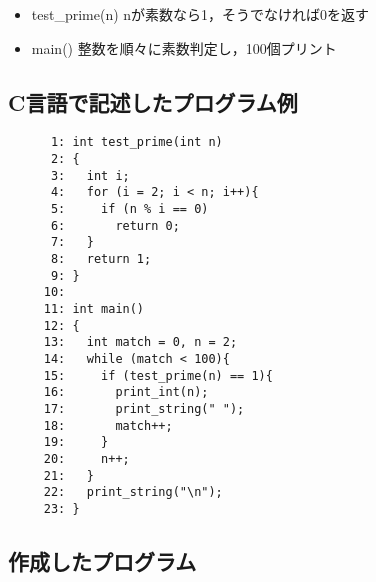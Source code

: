 \documentclass[a4j,11pt]{jarticle}
\begin{document}
\begin{itemize}
      \item test\_prime(n)    nが素数なら1，そうでなければ0を返す
      \item main()       整数を順々に素数判定し，100個プリント
\end{itemize}

\subsection{C言語で記述したプログラム例}

\begin{verbatim}
      1: int test_prime(int n)
      2: {
      3:   int i;
      4:   for (i = 2; i < n; i++){
      5:     if (n % i == 0)
      6:       return 0;
      7:   }
      8:   return 1;
      9: }
     10: 
     11: int main()
     12: {
     13:   int match = 0, n = 2;
     14:   while (match < 100){
     15:     if (test_prime(n) == 1){
     16:       print_int(n);
     17:       print_string(" ");
     18:       match++;
     19:     }
     20:     n++;
     21:   }
     22:   print_string("\n");
     23: }
\end{verbatim}

\subsection{作成したプログラム}
\end{document}
